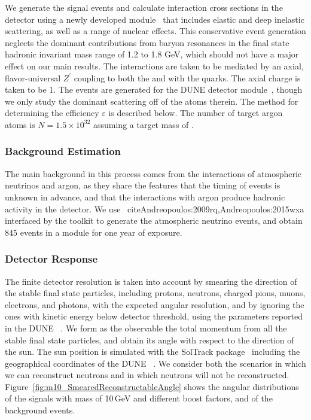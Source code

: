 We generate the signal events and calculate interaction cross sections in the detector using a newly developed  module~\cite{Andreopoulos:2009rq,Andreopoulos:2015wxa,Berger:2018} that includes elastic and deep inelastic scattering, as well as a range of nuclear effects. This conservative event generation neglects the dominant contributions from baryon resonances in the final state hadronic invariant mass range of 1.2 to 1.8 GeV, which should not have a major effect on our main results. The interactions are taken to be mediated by an axial, flavor-universal $Z^\prime$ coupling to both the  and with the quarks. The axial charge is taken to be 1. 
The events are generated for the \nominalmodsize DUNE detector module~\cite{dunetpc_code}, though we only study the dominant scattering off of the  atoms therein. The method for determining the efficiency $\varepsilon$ is described below. The number of target argon atoms is $N = 1.5  \times 10^{32}$ assuming a target mass of \nominalmodsize{}.

\subsubsection{Background Estimation}
\label{sec:background}

The main background in this process comes from the  
interactions of atmospheric neutrinos and argon,
as they share the features that the timing of events is unknown in advance,
and that the interactions with argon produce hadronic activity in the detector.
We use ~cite{Andreopoulos:2009rq,Andreopoulos:2015wxa}
interfaced by the  toolkit to generate the  atmospheric
neutrino events, and obtain 845 events in a \nominalmodsize{} module for one year of
exposure.

\subsubsection{Detector Response}
\label{sec:detector_resp}

The finite detector resolution is taken into
account by smearing the direction of the stable final state particles, 
including protons, neutrons, charged pions, muons, electrons, and photons,
with the expected angular resolution,
and by ignoring the ones with kinetic energy below detector threshold,
using the parameters reported in the DUNE ~\cite{Acciarri:2015uup}.
We form as the observable the total momentum from all the stable final state particles,
and obtain its angle with respect to the direction of the sun.
The sun position is simulated with the SolTrack package~\cite{SolTrack}
including the geographical coordinates of the DUNE ~\cite{DUNE_DocDB136}.
We consider both the scenarios in which we can reconstruct neutrons and in which 
neutrons will not be reconstructed.
Figure~\ref{fig:m10_SmearedReconstructableAngle} shows the angular distributions of
the  signals with mass of 10\,GeV and different boost factors,
and of the background events.

